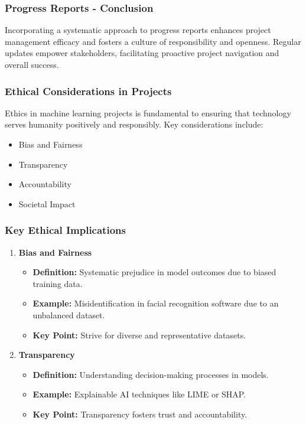 \documentclass[aspectratio=169]{beamer}
\begin{document}
\begin{frame}[fragile]
    \frametitle{Progress Reports - Conclusion}
    Incorporating a systematic approach to progress reports enhances project management efficacy and fosters a culture of responsibility and openness. Regular updates empower stakeholders, facilitating proactive project navigation and overall success.
\end{frame}

\begin{frame}[fragile]
    \frametitle{Ethical Considerations in Projects}
    Ethics in machine learning projects is fundamental to ensuring that technology serves humanity positively and responsibly. Key considerations include:
    \begin{itemize}
        \item Bias and Fairness
        \item Transparency
        \item Accountability
        \item Societal Impact
    \end{itemize}
\end{frame}

\begin{frame}[fragile]
    \frametitle{Key Ethical Implications}
    \begin{enumerate}
        \item \textbf{Bias and Fairness}
        \begin{itemize}
            \item \textbf{Definition:} Systematic prejudice in model outcomes due to biased training data.
            \item \textbf{Example:} Misidentification in facial recognition software due to an unbalanced dataset.
            \item \textbf{Key Point:} Strive for diverse and representative datasets.
        \end{itemize}
        
        \item \textbf{Transparency}
        \begin{itemize}
            \item \textbf{Definition:} Understanding decision-making processes in models.
            \item \textbf{Example:} Explainable AI techniques like LIME or SHAP.
            \item \textbf{Key Point:} Transparency fosters trust and accountability.
        \end{itemize}
    \end{enumerate}
\end{frame}
\end{document}
